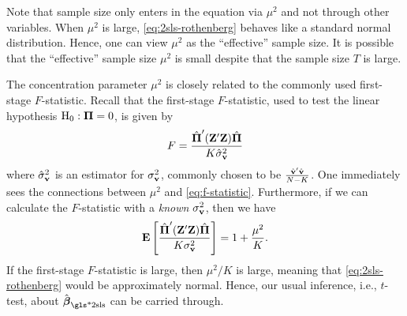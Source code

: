 \documentclass[a4paper]{article}
\begin{document}
\begin{remark}\label{rmk:concentration-is-effective-sample-size}
	Note that sample size only enters in the equation via $\mu^2$ and not through other variables.
	When $\mu^2$ is large, \eqref{eq:2sls-rothenberg} behaves like a standard normal distribution.
	Hence, one can view $\mu^2$ as the ``effective'' sample size.
	It is possible that the ``effective'' sample size $\mu^2$ is small despite that the sample size $T$ is large.
\end{remark}

\begin{remark}\label{rmk:concentration-and-f-statistic}
	The concentration parameter $\mu^2$ is closely related to the commonly used first-stage $F$-statistic.
	Recall that the first-stage $F$-statistic, used to test the linear hypothesis $\mathrm{H}_0:\boldsymbol{\Pi}=0$, is given by
	\begin{align}\label{eq:f-statistic}
		F = \frac{ \hat{\boldsymbol{\Pi}}'(\mathbf{Z}'\mathbf{Z})\hat{\boldsymbol{\Pi}} }{ K \hat\sigma_{\mathbf{v}}^2 }
	\end{align}
	where $\hat\sigma_{\mathbf{v}}^2$ is an estimator for $\sigma_{\mathbf{v}}^2$,
	commonly chosen to be $\frac{\hat{\mathbf{v}}'\hat{\mathbf{v}}}{N-K}$.
	One immediately sees the connections between $\mu^2$ and \eqref{eq:f-statistic}.
	Furthermore, if we can calculate the $F$-statistic with a \emph{known} $\sigma_{\mathbf{v}}^2$, then we have
	\begin{align*}
		\operatorname{\text{\textrm{\upshape\textbf{E}}}}\left[\frac{ \hat{\boldsymbol{\Pi}}'(\mathbf{Z}'\mathbf{Z})\hat{\boldsymbol{\Pi}} }{ K \sigma_{\mathbf{v}}^2 }\right] = 1 + \frac{\mu^2}{K}.
	\end{align*}
	If the first-stage $F$-statistic is large, then $\mu^2/K$ is large,
	meaning that \eqref{eq:2sls-rothenberg} would be approximately normal.
	Hence, our usual inference, i.e., $t$-test, about $\hat\bbeta_{\text{\gls*{2sls}}}$ can be carried through.
	\parencite{stock-wright-yogo-2002}
\end{remark}
\end{document}
